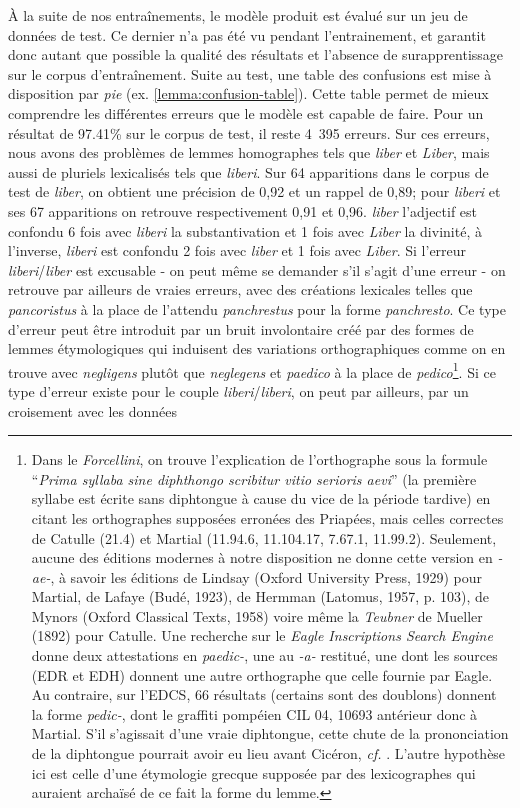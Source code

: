 À la suite de nos entraînements, le modèle produit est évalué sur un jeu de données de test. Ce dernier n'a pas été vu pendant l'entrainement, et garantit donc autant que possible la qualité des résultats et l'absence de surapprentissage sur le corpus d'entraînement. Suite au test, une table des confusions est mise à disposition par \textit{pie} (ex. \ref{lemma:confusion-table}). Cette table permet de mieux comprendre les différentes erreurs que le modèle est capable de faire. Pour un résultat de 97.41\% sur le corpus de test, il reste 4~395 erreurs. Sur ces erreurs, nous avons des problèmes de lemmes homographes tels que \textit{liber} et \textit{Liber}, mais aussi de pluriels lexicalisés tels que \textit{liberi}. Sur 64 apparitions dans le corpus de test de \textit{liber}, on obtient une précision de 0,92 et un rappel de 0,89; pour \textit{liberi} et ses 67 apparitions on retrouve respectivement 0,91 et 0,96. \textit{liber} l'adjectif est confondu 6 fois avec \textit{liberi} la substantivation et 1 fois avec \textit{Liber} la divinité, à l'inverse, \textit{liberi} est confondu 2 fois avec \textit{liber} et 1 fois avec \textit{Liber}. Si l'erreur \textit{liberi}/\textit{liber} est excusable - on peut même se demander s'il s'agit d'une erreur - on retrouve par ailleurs de vraies erreurs, avec des créations lexicales telles que \textit{pancoristus} à la place de l'attendu \textit{panchrestus} pour la forme \textit{panchresto}. Ce type d'erreur peut être introduit par un bruit involontaire créé par des formes de lemmes étymologiques qui induisent des variations orthographiques comme on en trouve avec \textit{negligens} plutôt que \textit{neglegens} et \textit{paedico} à la place de \textit{pedico}\footnote{Dans le \textit{Forcellini}, on trouve l'explication de l'orthographe sous la formule \enquote{\textit{Prima syllaba sine diphthongo scribitur vitio serioris aevi}} (la première syllabe est écrite sans diphtongue à cause du vice de la période tardive) en citant les orthographes supposées erronées des Priapées, mais celles correctes de Catulle (21.4) et Martial (11.94.6, 11.104.17, 7.67.1, 11.99.2). Seulement, aucune des éditions modernes à notre disposition ne donne cette version en \textit{-ae-}, à savoir les éditions de Lindsay (Oxford University Press, 1929) pour Martial, de Lafaye (Budé, 1923), de Hermman (Latomus, 1957, p. 103), de Mynors (Oxford Classical Texts, 1958) voire même la \textit{Teubner} de Mueller (1892) pour Catulle. Une recherche sur le \textit{Eagle Inscriptions Search Engine} donne deux attestations en \textit{paedic-}, une au \textit{-a-} restitué, une dont les sources (EDR et EDH) donnent une autre orthographe que celle fournie par Eagle. Au contraire, sur l'EDCS, 66 résultats (certains sont des doublons) donnent la forme \textit{pedic-}, dont le graffiti pompéien CIL 04, 10693 antérieur donc à Martial. S'il s'agissait d'une vraie diphtongue, cette chute de la prononciation de la diphtongue pourrait avoir eu lieu avant Cicéron, \textit{cf.} \cite{sturtevant_monophthongization_1916}. L'autre hypothèse ici est celle d'une étymologie grecque supposée par des lexicographes qui auraient archaïsé de ce fait la forme du lemme.}. Si ce type d'erreur existe pour le couple \textit{liberi}/\textit{liberi}, on peut par ailleurs, par un croisement avec les données 